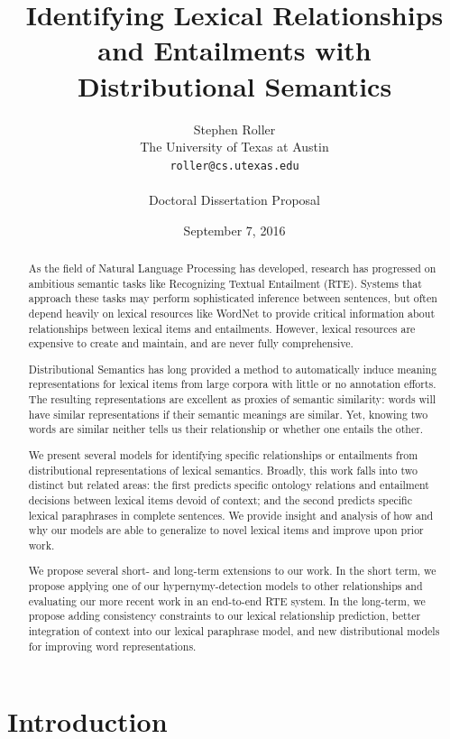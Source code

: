 \documentclass[12pt]{article}
\title{Identifying Lexical Relationships and Entailments with Distributional Semantics}
\author{Stephen Roller\\
The University of Texas at Austin\\
{\tt roller@cs.utexas.edu}\\
\\
Doctoral Dissertation Proposal}
\date{September 7, 2016}
\begin{document}
\maketitle

\begin{abstract}
  As the field of Natural Language Processing has developed, research has
  progressed on ambitious semantic tasks like Recognizing Textual Entailment
  (RTE). Systems that approach these tasks may perform sophisticated
  inference between sentences, but often depend heavily on lexical resources
  like WordNet to provide critical information about relationships between
  lexical items and entailments. However, lexical resources are expensive to
  create and maintain, and are never fully comprehensive.

  Distributional Semantics has long provided a method to automatically induce
  meaning representations for lexical items from large corpora with little or
  no annotation efforts. The resulting representations are excellent
  as proxies of semantic similarity: words will have similar representations if
  their semantic meanings are similar. Yet, knowing two words are similar
  neither tells us their relationship or whether one entails the other.

  We present several models for identifying specific relationships or
  entailments from distributional representations of lexical semantics.
  Broadly, this work falls into two distinct but related areas: the first
  predicts specific ontology relations and entailment decisions between
  lexical items devoid of context; and the second predicts specific lexical
  paraphrases in complete sentences. We provide insight and analysis of how and
  why our models are able to generalize to novel lexical items and
  improve upon prior work.

  We propose several short- and long-term extensions to our work. In the
  short term, we propose applying one of our hypernymy-detection models to
  other relationships and evaluating our more recent work in an end-to-end
  RTE system. In the long-term, we propose adding consistency constraints to
  our lexical relationship prediction, better integration of context into
  our lexical paraphrase model, and new distributional models for improving
  word representations.
\end{abstract}

\pagebreak
\tableofcontents
\pagebreak

\section{Introduction}
\label{sec:intro}
\end{document}
